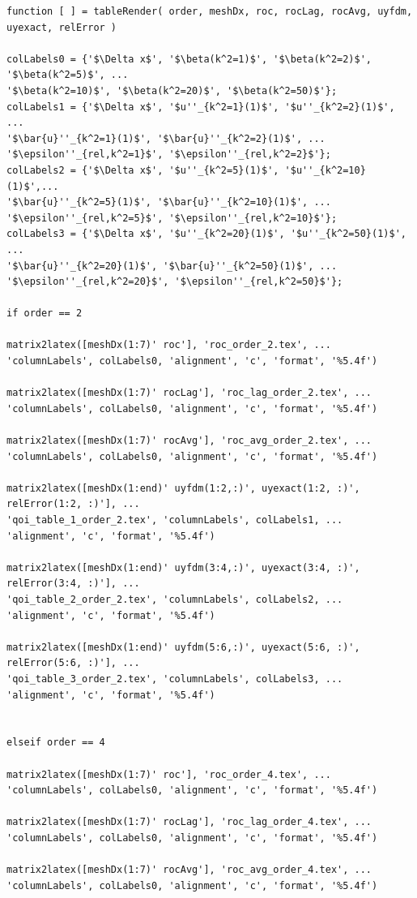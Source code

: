 \documentclass[10pt]{article}		%
\numberwithin{equation}{section}
\begin{document}
\begin{lstlisting}
function [ ] = tableRender( order, meshDx, roc, rocLag, rocAvg, uyfdm, uyexact, relError )

colLabels0 = {'$\Delta x$', '$\beta(k^2=1)$', '$\beta(k^2=2)$', '$\beta(k^2=5)$', ...
'$\beta(k^2=10)$', '$\beta(k^2=20)$', '$\beta(k^2=50)$'};
colLabels1 = {'$\Delta x$', '$u''_{k^2=1}(1)$', '$u''_{k^2=2}(1)$', ...
'$\bar{u}''_{k^2=1}(1)$', '$\bar{u}''_{k^2=2}(1)$', ...
'$\epsilon''_{rel,k^2=1}$', '$\epsilon''_{rel,k^2=2}$'};
colLabels2 = {'$\Delta x$', '$u''_{k^2=5}(1)$', '$u''_{k^2=10}(1)$',...
'$\bar{u}''_{k^2=5}(1)$', '$\bar{u}''_{k^2=10}(1)$', ...
'$\epsilon''_{rel,k^2=5}$', '$\epsilon''_{rel,k^2=10}$'};
colLabels3 = {'$\Delta x$', '$u''_{k^2=20}(1)$', '$u''_{k^2=50}(1)$', ...
'$\bar{u}''_{k^2=20}(1)$', '$\bar{u}''_{k^2=50}(1)$', ...
'$\epsilon''_{rel,k^2=20}$', '$\epsilon''_{rel,k^2=50}$'};

if order == 2

matrix2latex([meshDx(1:7)' roc'], 'roc_order_2.tex', ...
'columnLabels', colLabels0, 'alignment', 'c', 'format', '%5.4f')

matrix2latex([meshDx(1:7)' rocLag'], 'roc_lag_order_2.tex', ...
'columnLabels', colLabels0, 'alignment', 'c', 'format', '%5.4f')

matrix2latex([meshDx(1:7)' rocAvg'], 'roc_avg_order_2.tex', ...
'columnLabels', colLabels0, 'alignment', 'c', 'format', '%5.4f')

matrix2latex([meshDx(1:end)' uyfdm(1:2,:)', uyexact(1:2, :)', relError(1:2, :)'], ...
'qoi_table_1_order_2.tex', 'columnLabels', colLabels1, ...
'alignment', 'c', 'format', '%5.4f')

matrix2latex([meshDx(1:end)' uyfdm(3:4,:)', uyexact(3:4, :)', relError(3:4, :)'], ...
'qoi_table_2_order_2.tex', 'columnLabels', colLabels2, ...
'alignment', 'c', 'format', '%5.4f')

matrix2latex([meshDx(1:end)' uyfdm(5:6,:)', uyexact(5:6, :)', relError(5:6, :)'], ...
'qoi_table_3_order_2.tex', 'columnLabels', colLabels3, ...
'alignment', 'c', 'format', '%5.4f')


elseif order == 4

matrix2latex([meshDx(1:7)' roc'], 'roc_order_4.tex', ...
'columnLabels', colLabels0, 'alignment', 'c', 'format', '%5.4f')

matrix2latex([meshDx(1:7)' rocLag'], 'roc_lag_order_4.tex', ...
'columnLabels', colLabels0, 'alignment', 'c', 'format', '%5.4f')

matrix2latex([meshDx(1:7)' rocAvg'], 'roc_avg_order_4.tex', ...
'columnLabels', colLabels0, 'alignment', 'c', 'format', '%5.4f')


\end{lstlisting}
\end{document}
